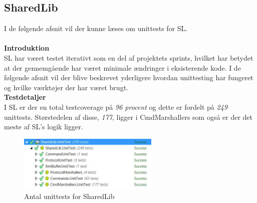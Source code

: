 \subsection{SharedLib}
I de følgende afsnit vil der kunne læses om unittests for \gls{SL}.\\\\


\textbf{Introduktion}\\
\gls{SL} har været testet iterativt som en del af projektets sprints, hvilket har betydet at der gennemgående har været minimale ændringer i eksisterende kode. I de følgende afsnit vil der blive beskrevet yderligere hvordan unittesting har fungeret og hvilke værktøjer der har været brugt.\\

\textbf{Testdetaljer}\\
I \gls{SL} er der en total testcoverage på \textit{96 procent} og dette er fordelt på \textit{249} unittests. Størstedelen af disse, \textit{177}, ligger i CmdMarshallers som også er der det meste af \gls{SL}'s logik ligger. 

\begin{figure}[H]
	\centering
	\includegraphics[width=0.60\textwidth]{Test/SharedLib/UnitTests/Unittests.jpg}
	\caption{Antal unittests for SharedLib}
	\label{fig:antalunitSL}
\end{figure}


